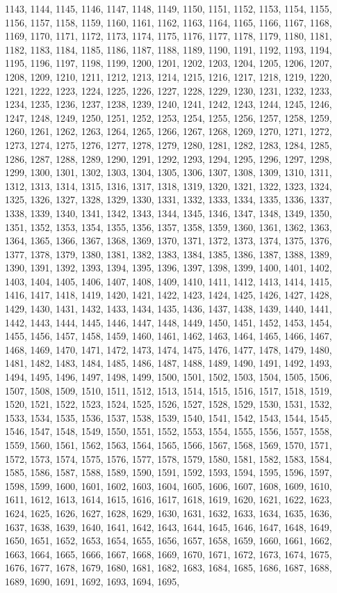 {{{{{{{{{{{{{1143, 1144, 1145, 1146, 1147, 1148, 1149, 1150, 1151, 1152, 1153, 1154, 1155, 1156, 1157, 1158, 1159, 1160, 1161, 1162, 1163, 1164, 1165, 1166, 1167, 1168, 1169, 1170, 1171, 1172, 1173, 1174, 1175, 1176, 1177, 1178, 1179, 1180, 1181, 1182, 1183, 1184, 1185, 1186, 1187, 1188, 1189, 1190, 1191, 1192, 1193, 1194, 1195, 1196, 1197, 1198, 1199, 1200, 1201, 1202, 1203, 1204, 1205, 1206, 1207, 1208, 1209, 1210, 1211, 1212, 1213, 1214, 1215, 1216, 1217, 1218, 1219, 1220, 1221, 1222, 1223, 1224, 1225, 1226, 1227, 1228, 1229, 1230, 1231, 1232, 1233, 1234, 1235, 1236, 1237, 1238, 1239, 1240, 1241, 1242, 1243, 1244, 1245, 1246, 1247, 1248, 1249, 1250, 1251, 1252, 1253, 1254, 1255, 1256, 1257, 1258, 1259, 1260, 1261, 1262, 1263, 1264, 1265, 1266, 1267, 1268, 1269, 1270, 1271, 1272, 1273, 1274, 1275, 1276, 1277, 1278, 1279, 1280, 1281, 1282, 1283, 1284, 1285, 1286, 1287, 1288, 1289, 1290, 1291, 1292, 1293, 1294, 1295, 1296, 1297, 1298, 1299, 1300, 1301, 1302, 1303, 1304, 1305, 1306, 1307, 1308, 1309, 1310, 1311, 1312, 1313, 1314, 1315, 1316, 1317, 1318, 1319, 1320, 1321, 1322, 1323, 1324, 1325, 1326, 1327, 1328, 1329, 1330, 1331, 1332, 1333, 1334, 1335, 1336, 1337, 1338, 1339, 1340, 1341, 1342, 1343, 1344, 1345, 1346, 1347, 1348, 1349, 1350, 1351, 1352, 1353, 1354, 1355, 1356, 1357, 1358, 1359, 1360, 1361, 1362, 1363, 1364, 1365, 1366, 1367, 1368, 1369, 1370, 1371, 1372, 1373, 1374, 1375, 1376, 1377, 1378, 1379, 1380, 1381, 1382, 1383, 1384, 1385, 1386, 1387, 1388, 1389, 1390, 1391, 1392, 1393, 1394, 1395, 1396, 1397, 1398, 1399, 1400, 1401, 1402, 1403, 1404, 1405, 1406, 1407, 1408, 1409, 1410, 1411, 1412, 1413, 1414, 1415, 1416, 1417, 1418, 1419, 1420, 1421, 1422, 1423, 1424, 1425, 1426, 1427, 1428, 1429, 1430, 1431, 1432, 1433, 1434, 1435, 1436, 1437, 1438, 1439, 1440, 1441, 1442, 1443, 1444, 1445, 1446, 1447, 1448, 1449, 1450, 1451, 1452, 1453, 1454, 1455, 1456, 1457, 1458, 1459, 1460, 1461, 1462, 1463, 1464, 1465, 1466, 1467, 1468, 1469, 1470, 1471, 1472, 1473, 1474, 1475, 1476, 1477, 1478, 1479, 1480, 1481, 1482, 1483, 1484, 1485, 1486, 1487, 1488, 1489, 1490, 1491, 1492, 1493, 1494, 1495, 1496, 1497, 1498, 1499, 1500, 1501, 1502, 1503, 1504, 1505, 1506, 1507, 1508, 1509, 1510, 1511, 1512, 1513, 1514, 1515, 1516, 1517, 1518, 1519, 1520, 1521, 1522, 1523, 1524, 1525, 1526, 1527, 1528, 1529, 1530, 1531, 1532, 1533, 1534, 1535, 1536, 1537, 1538, 1539, 1540, 1541, 1542, 1543, 1544, 1545, 1546, 1547, 1548, 1549, 1550, 1551, 1552, 1553, 1554, 1555, 1556, 1557, 1558, 1559, 1560, 1561, 1562, 1563, 1564, 1565, 1566, 1567, 1568, 1569, 1570, 1571, 1572, 1573, 1574, 1575, 1576, 1577, 1578, 1579, 1580, 1581, 1582, 1583, 1584, 1585, 1586, 1587, 1588, 1589, 1590, 1591, 1592, 1593, 1594, 1595, 1596, 1597, 1598, 1599, 1600, 1601, 1602, 1603, 1604, 1605, 1606, 1607, 1608, 1609, 1610, 1611, 1612, 1613, 1614, 1615, 1616, 1617, 1618, 1619, 1620, 1621, 1622, 1623, 1624, 1625, 1626, 1627, 1628, 1629, 1630, 1631, 1632, 1633, 1634, 1635, 1636, 1637, 1638, 1639, 1640, 1641, 1642, 1643, 1644, 1645, 1646, 1647, 1648, 1649, 1650, 1651, 1652, 1653, 1654, 1655, 1656, 1657, 1658, 1659, 1660, 1661, 1662, 1663, 1664, 1665, 1666, 1667, 1668, 1669, 1670, 1671, 1672, 1673, 1674, 1675, 1676, 1677, 1678, 1679, 1680, 1681, 1682, 1683, 1684, 1685, 1686, 1687, 1688, 1689, 1690, 1691, 1692, 1693, 1694, 1695, }}}}}}}}}}}}}
